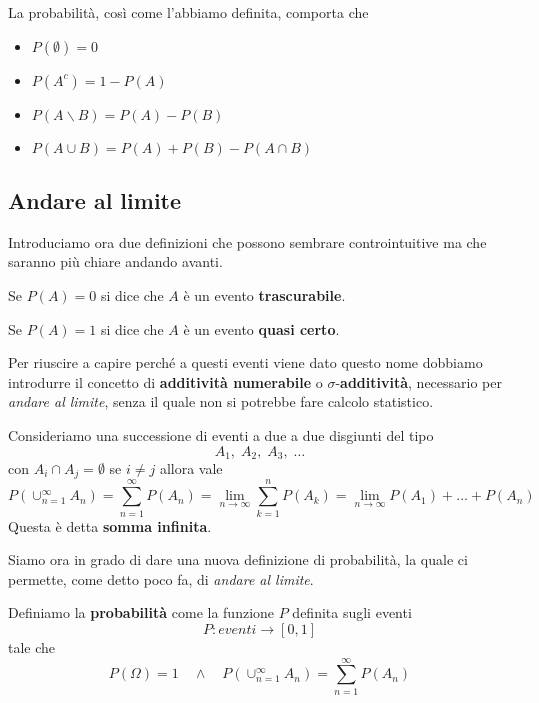 La probabilità, così come l'abbiamo definita, comporta che
\begin{itemize}
	\item $P(\emptyset) = 0$
	\item $P(A^c) = 1 - P(A)$
	\item $P(A \backslash B) = P(A) - P(B)$
	\item $P(A \cup B) = P(A) + P(B) - P(A \cap B)$
\end{itemize}

\subsection{Andare al limite}
Introduciamo ora due definizioni che possono sembrare controintuitive ma che saranno più chiare andando
avanti.

\begin{definition}
	Se $P(A) = 0$ si dice che $A$ è un evento \textbf{trascurabile}.
\end{definition}

\begin{definition}
	Se $P(A) = 1$ si dice che $A$ è un evento \textbf{quasi certo}.
\end{definition}

Per riuscire a capire perché a questi eventi viene dato questo nome dobbiamo introdurre il concetto di
\textbf{additività numerabile} o $\sigma$-\textbf{additività}, necessario per \emph{andare al limite},
senza il quale non si potrebbe fare calcolo statistico.

\begin{theorem}
	Consideriamo una successione di eventi a due a due disgiunti del tipo
	\[ A_1, \; A_2, \; A_3, \; \dots \]
	con $A_i \cap A_j = \emptyset$ se $i \neq j$ allora vale
	\[
		P(\cup_{n=1}^\infty A_n) = \sum_{n=1}^\infty P(A_n) =
		\lim_{n \to \infty} \sum_{k=1}^n P(A_k) = 	\lim_{n \to \infty} P(A_1) + \dots + P(A_n)
	\]
	Questa è detta \textbf{somma infinita}.
\end{theorem}

Siamo ora in grado di dare una nuova definizione di probabilità, la quale ci permette, come detto poco fa,
di \emph{andare al limite}.
\begin{definition}
	Definiamo la \textbf{probabilità} come la funzione $P$ definita sugli eventi
	\[ P : eventi \to [0, 1] \]
	tale che
	\[
		P(\Omega) = 1 \quad \land \quad
		P(\cup_{n=1}^\infty A_n) = \sum_{n=1}^\infty P(A_n)
	\]
\end{definition}


